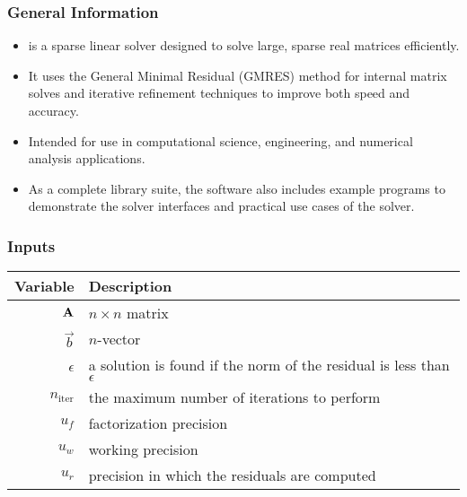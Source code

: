 \documentclass[t,12pt,numbers,fleqn]{beamer}
\begin{document}



\begin{frame}
\frametitle{General Information}

\begin{itemize}
\item \progname{} is a sparse linear solver designed to solve large, sparse real
  matrices efficiently.
\item It uses the General Minimal Residual (GMRES) method for internal matrix
  solves and iterative refinement techniques to improve both speed and accuracy.
\item Intended for use in computational science, engineering, and numerical
  analysis applications.
\item As a complete library suite, the software also includes example programs to
  demonstrate the solver interfaces and practical use cases of the solver.
\end{itemize}

\end{frame}


\begin{frame}
\frametitle{Inputs}

\begin{table}[hp]
  \centering
  \label{tab:inputs}
  \begin{tabularx}{1.0\linewidth}{rX}
    \toprule
    \textbf{Variable}  & \textbf{Description} \\
    \midrule
    \(\mathbf{A}\) & \(n \times n\) matrix \\
    \(\vec{b}\)        & \(n\)-vector \\
    \(\epsilon\)        & a solution is found if the norm of the residual is less than \(\epsilon\) \\
    \(n_\mathrm{iter}\) & the maximum number of iterations to perform \\
    \(u_f\)       & factorization precision \\
    \(u_w\)       & working precision \\
    \(u_r\)       & precision in which the residuals are computed \\
    \bottomrule
  \end{tabularx}
\end{table}

\end{frame}
\end{document}

